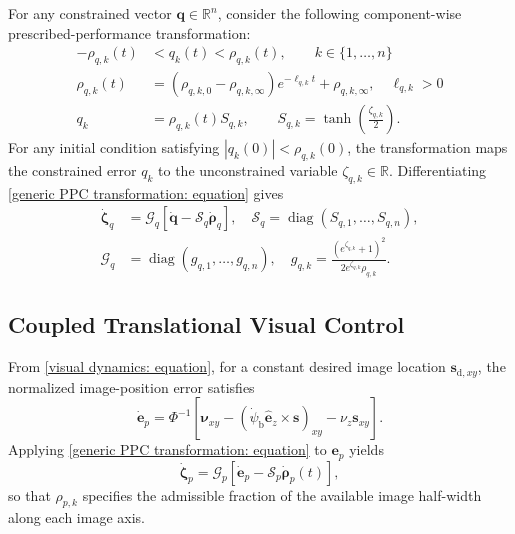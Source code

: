 \documentclass[10pt,conference]{IEEEtran}
\begin{document}
For any constrained vector $\boldsymbol q\in\mathbb R^n$, consider the following component-wise prescribed-performance transformation: 
\begin{equation}
    \begin{aligned}
    -\rho_{q,k}(t)&<q_k(t)<\rho_{q,k}(t), \qquad k\in\{1,\ldots,n\} \\ 
    \rho_{q,k}(t) &= (\rho_{q,k,0}-\rho_{q,k,\infty}) e^{-\ell_{q,k}t} + \rho_{q,k,\infty},  \quad \ell_{q,k}>0\\
    q_k &= \rho_{q,k}(t) S_{q,k}, \qquad
    S_{q,k} = \tanh\!\left(\frac{\zeta_{q,k}}{2}\right).
    \end{aligned}
    \label{generic PPC transformation: equation}
\end{equation}
For any initial condition satisfying $|q_k(0)|<\rho_{q,k}(0)$, the transformation maps the constrained error $q_k$ to the unconstrained variable $\zeta_{q,k}\in\mathbb R$. Differentiating \eqref{generic PPC transformation: equation} gives
\begin{equation}
    \begin{aligned}
    \dot{\boldsymbol\zeta}_q &= \mathcal G_q \left[ \dot{\boldsymbol q} - \mathcal S_q\dot{\boldsymbol\rho}_q \right], \quad \mathcal S_q = \operatorname{diag}(S_{q,1},\ldots,S_{q,n}), \\
    \mathcal G_q &= \operatorname{diag}(g_{q,1},\ldots,g_{q,n}), \quad
    g_{q,k} = \frac{(e^{\zeta_{q,k}}+1)^2} {2e^{\zeta_{q,k}}\rho_{q,k}}.
    \end{aligned}
    \label{generic transformed error dynamics: equation}
\end{equation}

\subsection{Coupled Translational Visual Control}
\label{subsec:translational_control}
From \eqref{visual dynamics: equation}, for a constant desired image location $\boldsymbol s_{\mathrm{d},xy}$, the normalized image-position error satisfies
\begin{equation}
    \dot{\boldsymbol e}_{p} = \Phi^{-1} \left[\boldsymbol\nu_{xy} - \left(\dot{\psi}_{\mathrm b}\hat{\boldsymbol e}_{z}\times\boldsymbol s\right)_{xy} - \nu_{z}\boldsymbol s_{xy} \right].
    \label{image position error dynamics: equation}
\end{equation}
Applying \eqref{generic PPC transformation: equation} to $\boldsymbol e_p$ yields
\begin{equation}
    \dot{\boldsymbol\zeta}_{p} = \mathcal G_{p} \left[ \dot{\boldsymbol e}_{p} - \mathcal S_{p}\dot{\boldsymbol\rho}_{p}(t) \right],
    \label{transformed image error dynamics: equation}
\end{equation}
so that $\rho_{p,k}$ specifies the admissible fraction of the available image half-width along each image axis.
\end{document}
